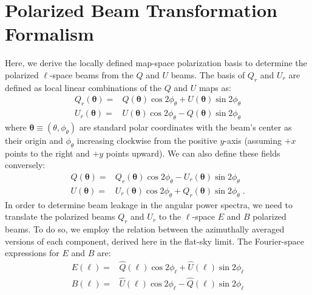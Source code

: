 \chapter{Polarized Beam Transformation Formalism} %
\label{app:act} 

Here, we derive the locally defined map-space polarization basis to determine the polarized $\ell$-space beams from the $Q$ and $U$ beams.  The basis of $Q_r$ and $U_r$ are defined as local linear combinations of the $Q$ and $U$ maps as:
\begin{equation} \label{eq:q_r}
\begin{split}
    Q_r(\boldsymbol{\theta}) =& Q(\boldsymbol{\theta}) \cos 2\phi_{\theta} + U(\boldsymbol{\theta}) \sin 2\phi_{\theta} \\
    U_r(\boldsymbol{\theta}) =& U(\boldsymbol{\theta}) \cos 2\phi_{\theta} - Q(\boldsymbol{\theta}) \sin 2\phi_{\theta}
\end{split}
\end{equation}
where $\boldsymbol{\theta} \equiv (\theta,\phi_\theta)$ are standard polar coordinates with the beam's center as their origin and $\phi_{\theta}$ increasing clockwise from the positive $y$-axis (assuming $+x$ points to the right and $+y$ points upward).  We can also define these fields conversely:
\begin{equation} \label{eq:q}
\begin{split}
    Q(\boldsymbol{\theta}) =& Q_r(\boldsymbol{\theta}) \cos 2\phi_{\theta} - U_r(\boldsymbol{\theta}) \sin 2\phi_{\theta} \\
    U(\boldsymbol{\theta}) =& U_r(\boldsymbol{\theta}) \cos 2\phi_{\theta} + Q_r(\boldsymbol{\theta}) \sin 2\phi_{\theta} \; .
\end{split}
\end{equation}
In order to determine beam leakage in the angular power spectra, we need to translate the polarized beams $Q_r$ and $U_r$ to the $\ell$-space $E$ and $B$ polarized beams.  To do so, we employ the relation between the azimuthally averaged versions of each component, derived here in the flat-sky limit.  The Fourier-space expressions for $E$ and $B$ are:
\begin{equation} \label{eq:e}
\begin{split}
        E(\boldsymbol{\ell}) =& \hat{Q}(\boldsymbol{\ell}) \cos 2\phi_{\ell} + \hat{U}(\boldsymbol{\ell}) \sin 2\phi_{\ell}\\
        B(\boldsymbol{\ell}) =& \hat{U}(\boldsymbol{\ell}) \cos 2\phi_{\ell} - \hat{Q}(\boldsymbol{\ell}) \sin 2\phi_{\ell}
\end{split}
\end{equation}
